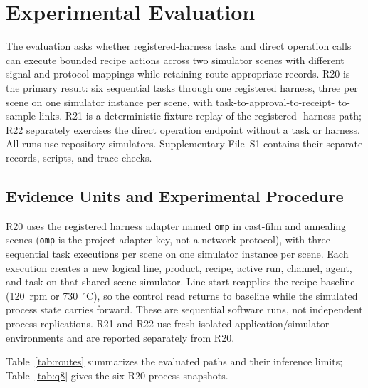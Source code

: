 \section{Experimental Evaluation}
\label{sec:eval}
The evaluation asks whether registered-harness tasks and direct operation calls
can execute bounded recipe actions across two simulator scenes with different
signal and protocol mappings while retaining route-appropriate records. R20 is
the primary result: six sequential tasks through one registered harness, three
per scene on one simulator instance per scene, with task-to-approval-to-receipt-
to-sample links. R21 is a deterministic fixture replay of the registered-
harness path; R22 separately exercises the direct operation endpoint without a
task or harness. All runs use repository simulators. Supplementary File~S1
contains their separate records, scripts, and trace checks.

\subsection{Evidence Units and Experimental Procedure}
\label{sec:testbed}
\label{sec:procedure}
R20 uses the registered harness adapter named \texttt{omp} in cast-film and
annealing scenes
(\texttt{omp} is the project adapter key, not a network protocol),
with three sequential task executions per scene on one simulator instance per
scene. Each execution creates a new logical line, product, recipe, active run,
channel, agent, and task on that shared scene simulator. Line start reapplies the recipe baseline
(120~rpm or 730~$^{\circ}$C), so the control read returns to baseline while
the simulated process state carries forward. These are sequential software
runs, not independent process replications. R21 and R22 use fresh isolated
application/simulator environments and are reported separately from R20.

Table~\ref{tab:routes} summarizes the evaluated paths and their inference
limits; Table~\ref{tab:q8} gives the six R20 process snapshots.

